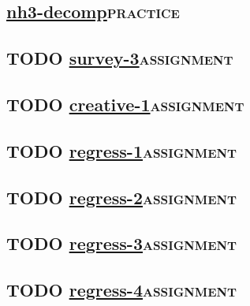 \documentclass[11pt]{article}
\begin{document}
\subsection{\url{nh3-decomp}\hfill{}\textsc{practice}}
\label{sec:orgheadline47}


\subsection{{\bfseries\sffamily TODO} \url{survey-3}\hfill{}\textsc{assignment}}
\label{survey-3}



\subsection{{\bfseries\sffamily TODO} \url{creative-1}\hfill{}\textsc{assignment}}
\label{creative-1}


\subsection{{\bfseries\sffamily TODO} \url{regress-1}\hfill{}\textsc{assignment}}
\label{regress-1}


\subsection{{\bfseries\sffamily TODO} \url{regress-2}\hfill{}\textsc{assignment}}
\label{regress-2}


\subsection{{\bfseries\sffamily TODO} \url{regress-3}\hfill{}\textsc{assignment}}
\label{regress-3}


\subsection{{\bfseries\sffamily TODO} \url{regress-4}\hfill{}\textsc{assignment}}
\label{regress-4}
\end{document}
